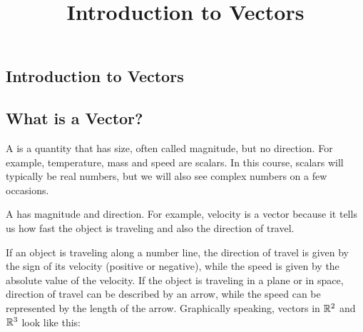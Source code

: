 \documentclass{ximera}
\title{Introduction to Vectors} \license{CC BY-NC-SA 4.0}
\begin{document}
\begin{abstract}

\end{abstract}
\maketitle

\begin{onlineOnly}
\section*{Introduction to Vectors}
\end{onlineOnly}

\subsection*{What is a Vector?}

A  is a quantity that has size, often called  magnitude, but no direction.  For example, temperature, mass and speed are scalars.  In this course, scalars will typically be real numbers, but we will also see complex numbers on a few occasions.  

A  has magnitude and direction.  For example, velocity is a vector because it tells us how fast the object is traveling and also the direction of travel.  

If an object is traveling along a number line, the direction of travel is given by the sign of its velocity (positive or negative), while the speed is given by the absolute value of the velocity.  If the object is traveling in a plane or in space, direction of travel can be described by an arrow, while the speed can be represented by the length of the arrow.  Graphically speaking, vectors in $\mathbb{R}^2$ and $\mathbb{R}^3$ look like this: 

\begin{center}
\end{center}
\end{document}
